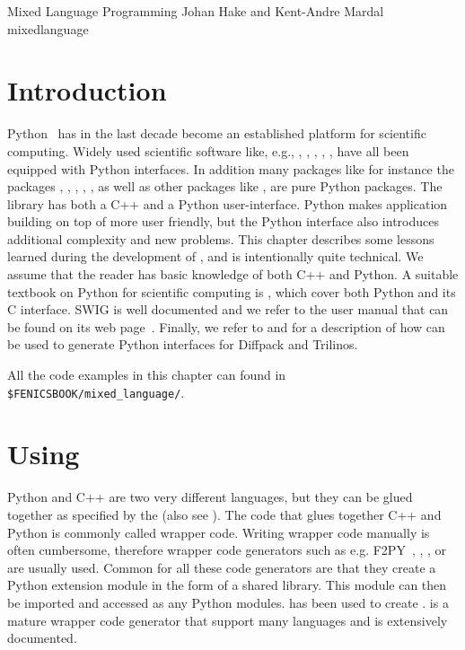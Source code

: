               {Mixed Language Programming}
              {Johan Hake and Kent-Andre Mardal}
              {mixedlanguage}

\section{Introduction}
Python~\cite{Rossum} has in the last decade become an established platform for scientific computing. Widely used scientific software like, e.g., \petsc\cite{www:petsc}, \hypre\cite{www:hypre}, \trilinos\cite{SalaSpotzHeroux2008}, \vtk\cite{www:vtk}, \itk, \ginac\cite{BauerFrinkKreckel2000} have all been equipped with Python interfaces. In addition many packages like for instance the \fenics packages \ferari, \fiat \cite{Kirby2006}, \ffc\cite{FFC}, \ufl\cite{Alnaes2009}, \viper, as well as other packages like \sympy\cite{CertikSeoanePetersonEtAl2009}, \scipy\cite{JonesOliphantPetersonEtAl2009} are pure Python packages. The \dolfin library has both a C++ and a Python user-interface. Python makes application building on top of \dolfin more user friendly, but the Python interface also introduces additional complexity and new problems. This chapter describes some lessons learned during the development of \pydolfin, and is intentionally quite technical. We assume that the reader has basic knowledge of both C++ and Python. A suitable textbook on Python for scientific computing is \cite{Langtangen2008}, which cover both Python and its C interface. SWIG is well documented and we refer to the user manual that can be found on its web page~\cite{www:swig}. Finally, we refer to \citet{Langtangen2003b} and \citet{SalaSpotzHeroux2008} for a description of how \swig can be used to generate Python interfaces for Diffpack and Trilinos.\par

All the code examples in this chapter can found in
\texttt{\$FENICSBOOK/mixed\_language/}.

\section{Using \swig}
Python and C++ are two very different languages, but they can be glued together as specified by the \cite{www:python-capi} (also see \citet{www:python-extending}). The code that glues together C++ and Python is commonly called wrapper code. Writing wrapper code manually is often cumbersome, therefore wrapper code generators such as e.g. F2PY~\cite{Peterson}, \cite{SIP}, \cite{Siloon}, or \swig~\cite{WestlieMardalAlnaes2009} are usually used.  Common for all these code generators are that they create a Python extension module in the form of a shared library. This module can then be imported and accessed as any Python modules. \swig has been used to create \pydolfin. \swig is a mature wrapper code generator that support many languages and is extensively documented.\par

